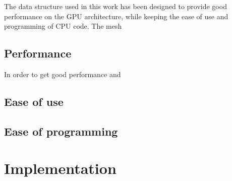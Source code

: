The data structure used in this work has been designed to provide good performance on the GPU
architecture, while keeping the ease of use and programming of CPU code. The mesh

\subsection{Performance} \label{section:graphics_processing_units:data_structure:performance}

In order to get good performance and 

\subsection{Ease of use} \label{section:graphics_processing_units:data_structure:ease_of_use}

\subsection{Ease of programming} \label{section:graphics_processing_units:data_structure:ease_of_programming}

\section{Implementation} \label{section:graphics_processing_units:implementation}
